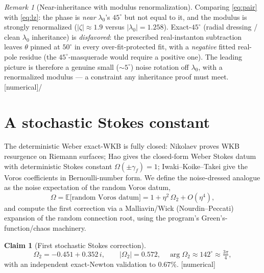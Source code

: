 \documentclass[11pt,reqno]{amsart}
\theoremstyle{plain}
\theoremstyle{definition}
\newtheorem{claim}[theorem]{Claim}
\theoremstyle{remark}
\newtheorem{remark}[theorem]{Remark}
\newcommand{\E}{\mathbb{E}}
\newcommand{\lz}{\lambda_0}
\newcommand{\tagN}{{\footnotesize\textsf{[numerical]}}}
\newcommand{\tagX}{{\footnotesize\textsf{[conjectural]}}}
\begin{document}
\begin{remark}[Near-inheritance with modulus renormalization]\label{rem:inheritance}
Comparing \eqref{eq:pair} with \eqref{eq:lz}: the phase is \emph{near} $\lz$'s $45^\circ$ but
not equal to it, and the modulus is strongly renormalized ($|\zeta|\approx1.9$ versus
$|\lz|=1.258$). Exact-$45^\circ$ (radial dressing / clean $\lz$ inheritance) is
\emph{disfavored}: the prescribed real-instanton subtraction leaves $\theta$ pinned at
$50^\circ$ in every over-fit-protected fit, with a \emph{negative} fitted real-pole residue
(the $45^\circ$-masquerade would require a positive one). The leading picture is therefore a
genuine small ($\sim5^\circ$) noise rotation off $\lz$, with a renormalized modulus --- a
constraint any inheritance proof must meet. \tagN\;/\;\tagX
\end{remark}

\section{A stochastic Stokes constant}\label{sec:stokes}

The deterministic Weber exact-WKB is fully closed: Nikolaev proves WKB resurgence on Riemann
surfaces; Hao gives the closed-form Weber Stokes datum with deterministic Stokes constant
$\Omega(\pm\gamma_f)=1$; Iwaki--Koike--Takei give the Voros coefficients in Bernoulli-number
form. We define the noise-dressed analogue as the noise expectation of the random Voros datum,
\begin{equation}\label{eq:stokesdef}
\Omega=\E\bigl[\text{random Voros datum}\bigr]=1+\eta^2\,\Omega_2+O(\eta^4),
\end{equation}
and compute the first correction via a Malliavin/Wick (Nourdin--Peccati) expansion of the
random connection root, using the program's Green's-function/chaos machinery.

\begin{claim}[First stochastic Stokes correction]\label{claim:omega2}
\begin{equation}\label{eq:omega2}
\Omega_2=-0.451+0.352\,i,\qquad |\Omega_2|=0.572,\quad \arg\Omega_2\approx142^\circ\approx\tfrac{3\pi}{4},
\end{equation}
with an independent exact-Newton validation to $0.67\%$. \tagN
\end{claim}
\end{document}
